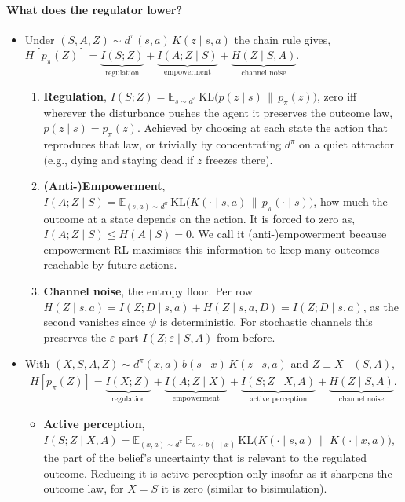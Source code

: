 \documentclass[10pt]{article}
\begin{document}
\paragraph{What does the regulator lower?}
\begin{itemize}
  \item Under $(S,A,Z) \sim d^\pi(s,a)\,K(z \mid s,a)$ the chain rule gives, $\displaystyle H[p_\pi(Z)] = \underbrace{I(S;Z)}_{\text{regulation}} + \underbrace{I(A;Z \mid S)}_{\text{empowerment}} + \underbrace{H(Z \mid S,A)}_{\text{channel noise}}$.
  \begin{enumerate}
    \item \textbf{Regulation}, $I(S;Z) = \mathbb E_{s \sim d^\pi}\,\mathrm{KL}\big(p(z \mid s)\,\|\,p_\pi(z)\big)$, zero iff wherever the disturbance pushes the agent it preserves the outcome law, $p(z \mid s) = p_\pi(z)$. Achieved by choosing at each state the action that reproduces that law, or trivially by concentrating $d^\pi$ on a quiet attractor (e.g., dying and staying dead if $z$ freezes there).
    \item \textbf{(Anti-)Empowerment}, $I(A;Z \mid S) = \mathbb E_{(s,a) \sim d^\pi}\,\mathrm{KL}\big(K(\cdot \mid s,a)\,\|\,p_\pi(\cdot \mid s)\big)$, how much the outcome at a state depends on the action. It is forced to zero as, $I(A;Z \mid S) \le H(A \mid S) = 0$.
    We call it (anti-)empowerment because empowerment RL maximises this information to keep many outcomes reachable by future actions. 
    \item \textbf{Channel noise}, the entropy floor. Per row $H(Z \mid s,a) = I(Z;D \mid s,a) + H(Z \mid s,a,D) = I(Z;D \mid s,a)$, as the second vanishes since $\psi$ is deterministic. For stochastic channels this preserves the $\varepsilon$ part $I(Z;\varepsilon \mid S,A)$ from before.
  \end{enumerate}
  \item With $(X,S,A,Z) \sim d^\pi(x,a)\,b(s \mid x)\,K(z \mid s,a)$ and $Z \perp X \mid (S,A)$,
    \begin{align*}
      H[p_\pi(Z)] = \underbrace{I(X;Z)}_{\text{regulation}} + \underbrace{I(A;Z \mid X)}_{\text{empowerment}} + \underbrace{I(S;Z \mid X,A)}_{\text{active perception}} + \underbrace{H(Z \mid S,A)}_{\text{channel noise}}.
    \end{align*}
  \begin{itemize}
    \item \textbf{Active perception}, $I(S;Z \mid X,A) = \mathbb E_{(x,a) \sim d^\pi}\,\mathbb E_{s \sim b(\cdot \mid x)}\,\mathrm{KL}\big(K(\cdot \mid s,a)\,\|\,K(\cdot \mid x,a)\big)$, the part of the belief's uncertainty that is relevant to the regulated outcome. Reducing it is active perception only insofar as it sharpens the outcome law, for $X=S$ it is zero (similar to bisimulation).
  \end{itemize}
\end{itemize}
\end{document}
